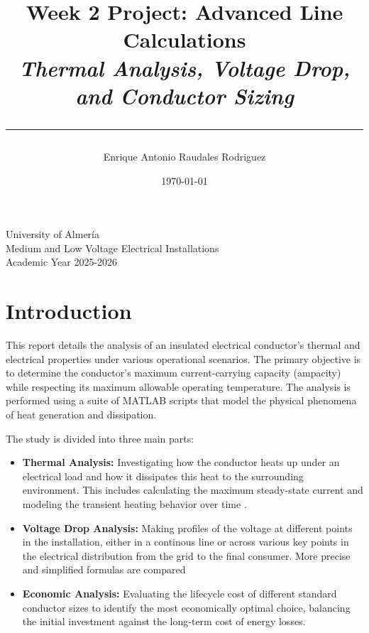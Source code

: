 \documentclass[12pt, a4paper]{article}
\title{
    \vspace{4cm} %
    \textbf{Week 2 Project: Advanced Line Calculations} \\
    \large \textit{Thermal Analysis, Voltage Drop, and Conductor Sizing} \\
    \vspace{1cm} %
    \rule{\textwidth}{0.4pt} %
}
\author{Enrique Antonio Raudales Rodriguez}
\date{\today}
\begin{document}
\begin{titlepage}
    \maketitle
    \vfill %
    \begin{center}
        \large University of Almería \\
        Medium and Low Voltage Electrical Installations \\
        Academic Year 2025-2026
    \end{center}
\end{titlepage}




\maketitle
\tableofcontents
\newpage

\section{Introduction}
This report details the analysis of an insulated electrical conductor's thermal and electrical properties under various operational scenarios. The primary objective is to determine the conductor's maximum current-carrying capacity (ampacity) while respecting its maximum allowable operating temperature. The analysis is performed using a suite of MATLAB scripts that model the physical phenomena of heat generation and dissipation.

The study is divided into three main parts:
\begin{itemize}
    \item \textbf{Thermal Analysis:} Investigating how the conductor heats up under an electrical load and how it dissipates this heat to the surrounding environment. This includes calculating the maximum steady-state current and modeling the transient heating behavior over time
.
 \item \textbf{Voltage Drop Analysis:} Making profiles of the voltage at different points in the installation, either in a continous line or across various key points in the electrical distribution from the grid to the final consumer. More precise and simplified formulas are compared

    \item \textbf{Economic Analysis:} Evaluating the lifecycle cost of different standard conductor sizes to identify the most economically optimal choice, balancing the initial investment against the long-term cost of energy losses.
\end{itemize}
\end{document}
